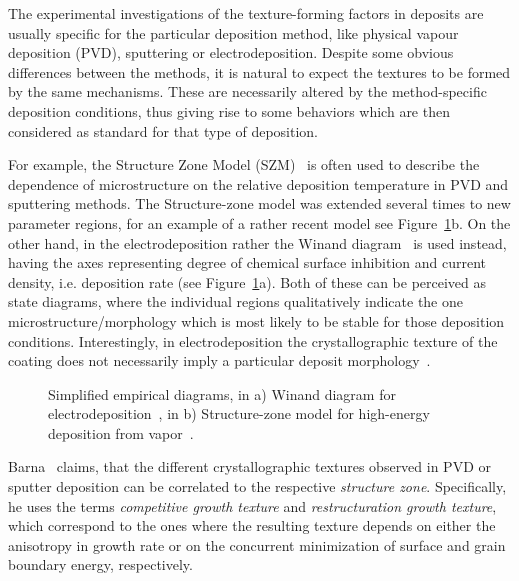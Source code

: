 The experimental investigations of the texture-forming factors in deposits are usually specific for the particular deposition method, like physical vapour deposition (PVD), sputtering or electrodeposition. Despite some obvious differences between the methods, it is natural to expect the textures to be formed by the same mechanisms. These are necessarily altered by the method-specific deposition conditions, thus giving rise to some behaviors which are then considered as standard for that type of deposition. 

For example, the Structure Zone Model (SZM)~\cite{Barna1998, Anders2010} is often used to describe the dependence of microstructure on the relative deposition temperature in PVD and sputtering methods. The Structure-zone model was extended several times to new parameter regions, for an example of a rather recent model see Figure~\ref{fig_SZM_and_Winand}b. On the other hand, in the electrodeposition rather the Winand diagram~\cite{Winand1992} is used instead, having the axes representing degree of chemical surface inhibition and current density, i.e. deposition rate (see Figure~\ref{fig_SZM_and_Winand}a). Both of these can be perceived as state diagrams, where the individual regions qualitatively indicate the one microstructure/morphology which is most likely to be stable for those deposition conditions. Interestingly, in electrodeposition the crystallographic texture of the coating does not necessarily imply a particular deposit morphology~\cite{Winand1992}.

\begin{figure}
	\centering
	\caption[Examples of Structure Zone Model and Winand diagram]{Simplified empirical diagrams, in a) Winand diagram for electrodeposition~\cite{Winand1992}, in b) Structure-zone model for high-energy deposition from vapor~\cite{Anders2010}.}
	\label{fig_SZM_and_Winand}
\end{figure}

Barna~\cite{Barna1998} claims, that the different crystallographic textures observed in PVD or sputter deposition can be correlated to the respective \textit{structure zone}. Specifically, he uses the terms \textit{competitive growth texture} and \textit{restructuration growth texture}, which correspond to the ones where the resulting texture depends on either the anisotropy in growth rate or on the concurrent minimization of surface and grain boundary energy, respectively.

